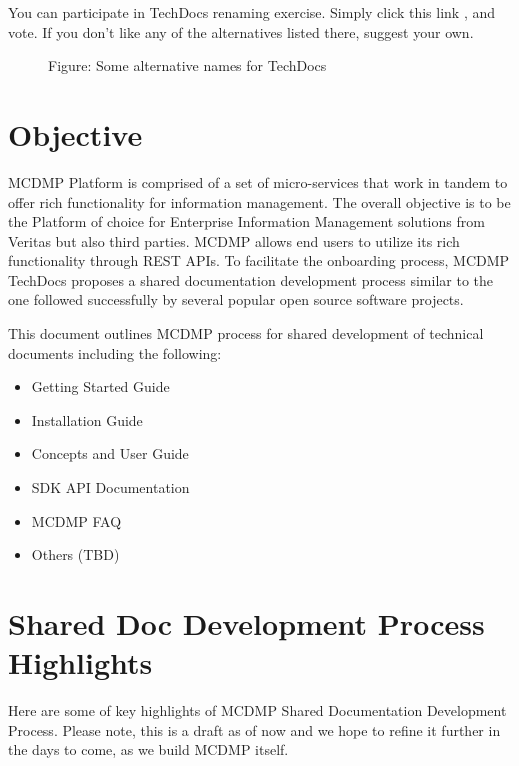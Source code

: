 \documentclass[letterpaper,10pt,english]{sphinxmanual}
\begin{document}
You can participate in TechDocs renaming exercise.  Simply click this link , and vote.  If you don’t like any of the alternatives listed there, suggest your own.

\begin{figure}[htbp]
\centering
\capstart

\noindent{}
\caption{Figure: Some alternative names for TechDocs}\label{\detokenize{mcdmp_docx_res:id3}}\end{figure}


\section{Objective}
\label{\detokenize{mcdmp_docx_res:objective}}
MCDMP Platform is comprised of a set of micro-services that work in tandem to offer rich functionality for information management.  The overall objective is to be the Platform of choice for Enterprise Information Management solutions from Veritas but also third parties. MCDMP allows end users to utilize its rich functionality through REST APIs. To facilitate the onboarding process, MCDMP TechDocs proposes a shared documentation development process similar to the one followed successfully by several popular open source software projects.

This document outlines MCDMP process for shared development of technical documents including the following:
\begin{itemize}
\item {} 
Getting Started Guide

\item {} 
Installation Guide

\item {} 
Concepts and User Guide

\item {} 
SDK API Documentation

\item {} 
MCDMP FAQ

\item {} 
Others (TBD)

\end{itemize}


\section{Shared Doc Development Process Highlights}
\label{\detokenize{mcdmp_docx_res:shared-doc-development-process-highlights}}
Here are some of key highlights of MCDMP Shared Documentation Development Process.  Please note, this is a draft as of now and we hope to refine it further in the days to come, as we build MCDMP itself.
\end{document}
